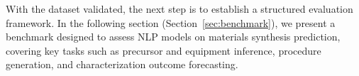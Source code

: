 With the dataset validated, the next step is to establish a structured evaluation framework.  
In the following section (Section~\ref{sec:benchmark}), we present a benchmark designed to assess NLP models on materials synthesis prediction, covering key tasks such as precursor and equipment inference, procedure generation, and characterization outcome forecasting.  







